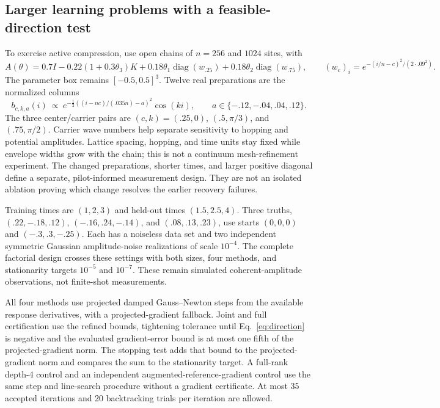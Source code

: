 \documentclass[10pt,letterpaper,twoside]{article}
\begin{document}
\subsection{Larger learning problems with a feasible-direction test}
To exercise active compression, use open chains of $n=256$ and $1024$ sites,
with
\begin{equation}
 A(\theta)=0.7I-0.22(1+0.3\theta_3)K+
 0.18\theta_1\operatorname{diag}(w_{.25})+
 0.18\theta_2\operatorname{diag}(w_{.75}),\qquad
 (w_c)_i=e^{-(i/n-c)^2/(2\cdot.09^2)}.
\end{equation}
The parameter box remains $[-0.5,0.5]^3$. Twelve real preparations are the
normalized columns
\begin{equation}
 b_{c,k,a}(i)\ \propto\ e^{-\frac12((i-nc)/(.035n)-a)^2}\cos(ki),\qquad
 a\in\{-.12,-.04,.04,.12\}.
\end{equation}
The three center/carrier pairs are $(c,k)=(.25,0)$, $(.5,\pi/3)$, and
$(.75,\pi/2)$. Carrier wave numbers help separate sensitivity to
hopping and potential amplitudes. Lattice spacing, hopping, and time units
stay fixed while envelope widths grow with the chain; this is not a continuum
mesh-refinement experiment. The changed preparations, shorter times, and
larger positive diagonal define a separate, pilot-informed measurement design.
They are not an isolated ablation proving which change resolves the earlier
recovery failures.

Training times are $(1,2,3)$ and held-out times $(1.5,2.5,4)$. Three truths,
$(.22,-.18,.12)$, $(-.16,.24,-.14)$, and $(.08,.13,.23)$, use starts
$(0,0,0)$ and $(-.3,.3,-.25)$. Each has a noiseless data set and two
independent symmetric Gaussian amplitude-noise realizations of scale $10^{-4}$.
The complete factorial design crosses these settings with both sizes, four
methods, and stationarity targets $10^{-5}$ and $10^{-7}$. These remain
simulated coherent-amplitude observations, not finite-shot measurements.

All four methods use projected damped Gauss--Newton steps from the available
response derivatives, with a projected-gradient fallback. Joint and full
certification use the refined bounds, tightening tolerance until
Eq.~\eqref{eq:direction} is negative and the evaluated gradient-error bound
is at most one fifth of the projected-gradient norm. The stopping test adds
that bound to the projected-gradient norm and compares the sum to the
stationarity target. A full-rank depth-4 control and an independent
augmented-reference-gradient control use the same step and line-search
procedure without a gradient certificate. At most 35 accepted iterations and
20 backtracking trials per iteration are allowed.
\end{document}

